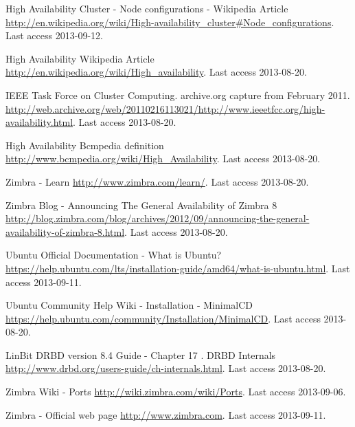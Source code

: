 
\begin{thebibliography}{1}


 High Availability Cluster - Node configurations - Wikipedia Article
\url{http://en.wikipedia.org/wiki/High-availability_cluster#Node_configurations}. Last access 2013-09-12.


 High Availability Wikipedia Article
\url{http://en.wikipedia.org/wiki/High_availability}. Last access 2013-08-20.

 IEEE Task Force on Cluster Computing. archive.org capture from February 2011.
\url{http://web.archive.org/web/20110216113021/http://www.ieeetfcc.org/high-availability.html}. Last access 2013-08-20.

 High Availability Bcmpedia definition
\url{http://www.bcmpedia.org/wiki/High_Availability}. Last access 2013-08-20.

 Zimbra - Learn
\url{http://www.zimbra.com/learn/}. Last access 2013-08-20.

 Zimbra Blog - Announcing The General Availability of Zimbra 8
\url{http://blog.zimbra.com/blog/archives/2012/09/announcing-the-general-availability-of-zimbra-8.html}. Last access 2013-08-20.


 Ubuntu Official Documentation - What is Ubuntu?
\url{https://help.ubuntu.com/lts/installation-guide/amd64/what-is-ubuntu.html}. Last access 2013-09-11.

 Ubuntu Community Help Wiki - Installation - MinimalCD
\url{https://help.ubuntu.com/community/Installation/MinimalCD}. Last access 2013-08-20.

 LinBit DRBD version 8.4 Guide - Chapter 17 . DRBD Internals
\url{http://www.drbd.org/users-guide/ch-internals.html}. Last access 2013-08-20.


 Zimbra Wiki - Ports
\url{http://wiki.zimbra.com/wiki/Ports}. Last access 2013-09-06.


 Zimbra - Official web page
\url{http://www.zimbra.com}. Last access 2013-09-11.


\end{thebibliography}
